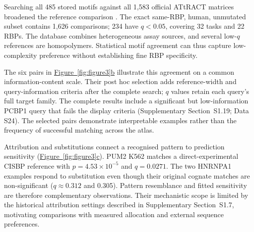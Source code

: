 \documentclass[webpdf,contemporary,large]{oup-authoring-template}
\newcommand{\figpanelref}[2]{\hyperref[#1]{Figure~\ref*{#1}#2}}
\newcommand{\supsect}[1]{Supplementary Section~#1}
\begin{document}
Searching all 485 stored motifs against all 1,583 official ATtRACT matrices broadened the reference comparison \citep{giudice2016attract}. The exact same-RBP, human, unmutated subset contains 1,626 comparisons; 234 have $q<0.05$, covering 32 tasks and 22 RBPs. The database combines heterogeneous assay sources, and several low-$q$ references are homopolymers. Statistical motif agreement can thus capture low-complexity preference without establishing fine RBP specificity.

The six pairs in \figpanelref{fig:figure3}{b} illustrate this agreement on a common information-content scale. Their post hoc selection adds reference-width and query-information criteria after the complete search; $q$ values retain each query's full target family. The complete results include a significant but low-information PCBP1 query that fails the display criteria (\supsect{S1.19}; Data S24). The selected pairs demonstrate interpretable examples rather than the frequency of successful matching across the atlas.

Attribution and substitutions connect a recognised pattern to prediction sensitivity (\figpanelref{fig:figure3}{c}). PUM2 K562 matches a direct-experimental CISBP reference with $p=4.53\times10^{-5}$ and $q=0.0271$. The two HNRNPA1 examples respond to substitution even though their original cognate matches are non-significant ($q\approx0.312$ and 0.305). Pattern resemblance and fitted sensitivity are therefore complementary observations. Their mechanistic scope is limited by the historical attribution settings described in \supsect{S1.7}, motivating comparisons with measured allocation and external sequence preferences.
\end{document}
